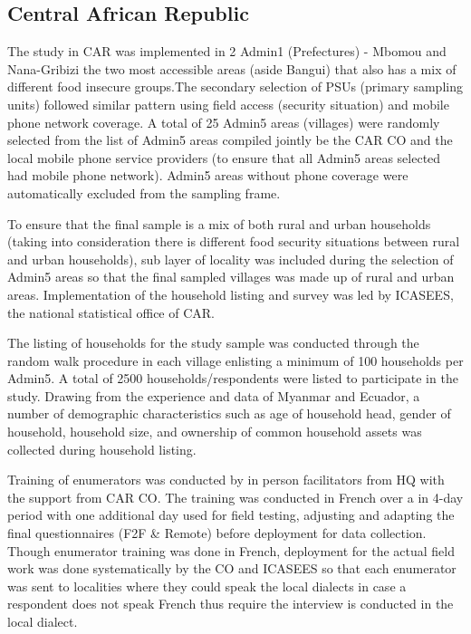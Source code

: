 \documentclass[11pt,harvard]{article}
\begin{document}
\subsection{Central African Republic}
	
The study in CAR was implemented in 2 Admin1 (Prefectures) - Mbomou and Nana-Gribizi the two most accessible areas (aside Bangui) that also has a mix of different food insecure groups.The secondary selection of PSUs (primary sampling units) followed similar pattern using field access (security situation) and mobile phone network coverage. A total of 25 Admin5 areas (villages) were randomly selected from the list of Admin5 areas compiled jointly be the CAR CO and the local mobile phone service providers (to ensure that all Admin5 areas selected had mobile phone network). Admin5 areas without phone coverage were automatically excluded from the sampling frame.
 
To ensure that the final sample is a mix of both rural and urban households (taking into consideration there is different food security situations between rural and urban households),  sub layer of locality was included during the selection of Admin5 areas so that the final sampled villages was made up of rural and urban areas. Implementation of the household listing and survey was led by ICASEES, the national statistical office of CAR.  

The listing of households for the study sample was conducted through the random walk procedure in each village enlisting a minimum of 100 households per Admin5. A total of 2500 households/respondents were listed to participate in the study. Drawing from the experience and data of Myanmar and Ecuador, a number of demographic characteristics such as age of household head, gender of household, household size, and ownership of common household assets was collected during household listing.
 
Training of enumerators was conducted by in person facilitators from HQ with the support from CAR CO. The training was conducted in French over a in 4-day period with one additional day used for field testing, adjusting and adapting the final questionnaires (F2F \& Remote) before deployment for data collection. Though enumerator training was done in French, deployment for the actual field work was done systematically by the CO and ICASEES so that each enumerator was sent to localities where they could speak the local dialects in case a respondent does not speak French thus require the interview is conducted in the local dialect.
\end{document}
